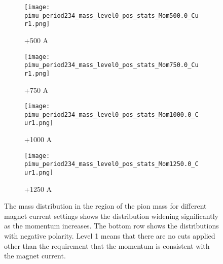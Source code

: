 \begin{figure}[h]
            \begin{subfigure}[b]{0.24\textwidth}
            \centering
            \texttt{[image: pimu\_period234\_mass\_level0\_pos\_stats\_Mom500.0\_Cur1.png]}
            \caption{+500 A}
            \label{fig_mpimu+500}
            \end{subfigure}
             \hfill   
            \begin{subfigure}[b]{0.24\textwidth}
            \centering
            \texttt{[image: pimu\_period234\_mass\_level0\_pos\_stats\_Mom750.0\_Cur1.png]}
            \caption{+750 A}
            \label{fig_mpimu+750}
            \end{subfigure}
             \hfill   
            \begin{subfigure}[b]{0.24\textwidth}
            \centering
            \texttt{[image: pimu\_period234\_mass\_level0\_pos\_stats\_Mom1000.0\_Cur1.png]}
            \caption{+1000 A}
            \label{fig_mpimu+1000}
            \end{subfigure}
             \hfill                             
             \begin{subfigure}[b]{0.24\textwidth}
            \centering
            \texttt{[image: pimu\_period234\_mass\_level0\_pos\_stats\_Mom1250.0\_Cur1.png]}
            \caption{+1250 A}
            \label{fig_mpimu+1250}
            \end{subfigure}
                        
\caption{The mass distribution in the region of the pion mass for different magnet current settings shows the distribution widening significantly as the momentum increases. The bottom row shows the distributions with negative polarity. Level 1 means that there are no cuts applied other than the requirement that the momentum is consistent with the magnet current.} 
\label{fig_pimumass}
  \end{figure}
 

